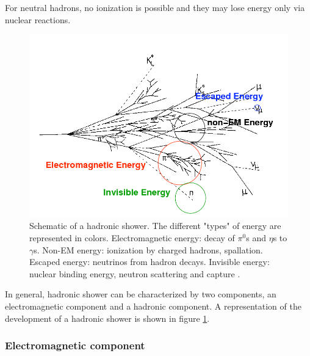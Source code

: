 For neutral hadrons, no ionization is possible and they may lose energy only via nuclear reactions.
\begin{figure}[htbp!]
  \centering
  \includegraphics[width=0.7\linewidth]{chap2/fig/images_had-shower.png}
  \caption{Schematic of a hadronic shower. The different "types" of energy are represented in colors. Electromagnetic energy: decay of $\pi^0$s and $\eta$s to $\gamma$s. Non-EM energy: ionization by charged hadrons, spallation. Escaped energy: neutrinos from hadron decays. Invisible energy: nuclear binding energy, neutron scattering and capture \cite{Grahn:2009ki}.} \label{fig:HadShower}
\end{figure}

In general, hadronic shower can be characterized by two components, an electromagnetic component and a hadronic component. A representation of the development of a hadronic shower is shown in figure \ref{fig:HadShower}.

\subsubsection{Electromagnetic component}

